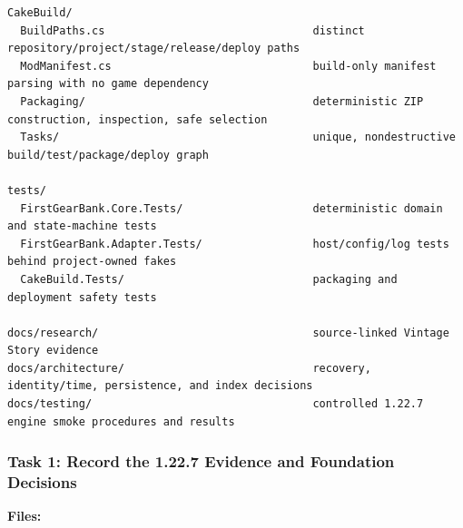 \documentclass[
  10pt,
  letterpaper,
]{article}
\begin{document}
\begin{lstlisting}
CakeBuild/
  BuildPaths.cs                                distinct repository/project/stage/release/deploy paths
  ModManifest.cs                               build-only manifest parsing with no game dependency
  Packaging/                                   deterministic ZIP construction, inspection, safe selection
  Tasks/                                       unique, nondestructive build/test/package/deploy graph

tests/
  FirstGearBank.Core.Tests/                    deterministic domain and state-machine tests
  FirstGearBank.Adapter.Tests/                 host/config/log tests behind project-owned fakes
  CakeBuild.Tests/                             packaging and deployment safety tests

docs/research/                                 source-linked Vintage Story evidence
docs/architecture/                             recovery, identity/time, persistence, and index decisions
docs/testing/                                  controlled 1.22.7 engine smoke procedures and results
\end{lstlisting}

\subsubsection{Task 1: Record the 1.22.7 Evidence and Foundation
Decisions}\label{task-1-record-the-1227-evidence-and-foundation-decisions}

\textbf{Files:}
\end{document}
